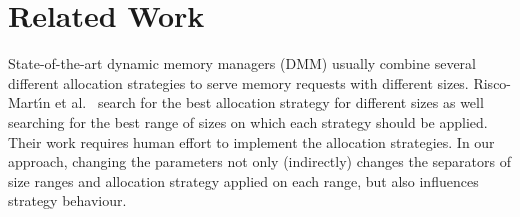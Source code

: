 \vspace{-2mm}

\section{Related Work}

State-of-the-art dynamic memory managers (DMM) usually combine several
different allocation strategies to serve memory requests with different
sizes. Risco-Mart\'{\i}n et al.~\cite{RiscoMartín2014109,
Colmenar:2011:MOD:2001576.2001820} search for the best allocation strategy
for different sizes as well searching for the best range of sizes on which
each strategy should be applied. 
Their work requires human effort to implement the
allocation strategies. In our approach, changing the parameters not
only (indirectly) changes the separators of size ranges and allocation
strategy applied on each range, but also influences strategy behaviour. 



